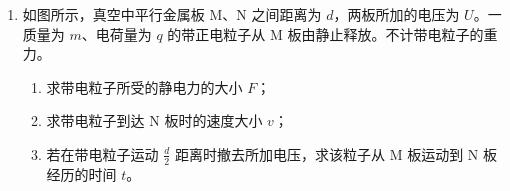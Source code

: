 \documentclass[\gkver]{gaokaozhenti}
\begin{document}
\begin{enumerate}
{$x = v_{0}t = 4.8\Um$

（2）乙同学垫起排球前瞬间排球在竖直方向速度的大小

$v_{y} = gt = 10 \times 0.6\Ums = 6\Ums$

根据 $v = \sqrt{v_{0}^{2} + v_{y}^{2}}$

得 $v = 10.0\Ums$；设速度方向与水平方向夹角为 $\theta$（如答图所示）


则有 $\tan\theta = \frac{v_{y}}{v_{0}} = 0.75$

（3）根据动量定理，排球与乙同学作用过程中所受冲量的大小 $I = 2mv = 6.0\UNs$
}

\item
如图所示，真空中平行金属板 M、N 之间距离为 $d$，两板所加的电压为 $U$。一质量为 $m$、电荷量为 $q$ 的带正电粒子从 M 板由静止释放。不计带电粒子的重力。
\begin{enumerate}
	\item
	求带电粒子所受的静电力的大小 $F$；
	\item
	求带电粒子到达 N 板时的速度大小 $v$；
	\item
	若在带电粒子运动 $\frac{d}{2}$ 距离时撤去所加电压，求该粒子从 M 板运动到 N 板经历的时间 $t$。
\end{enumerate}


\end{enumerate}
\end{document}
